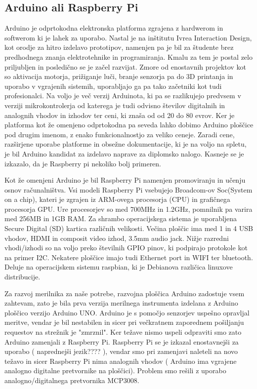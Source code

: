 \documentclass[12pt,a4paper,titlepage,openany]{report}
\begin{document}
\subsection{Arduino ali Raspberry Pi}
Arduino je odprtokodna elektronska platforma zgrajena z hardwerom in softwerom ki je lahek za uporabo. Nastal je na inštitutu Ivrea Interaction Design, kot orodje za hitro izdelavo prototipov, namenjen pa je bil za študente brez predhodnega znanja elektrotehnike in programiranja. Kmalu za tem je postal zelo priljubljen in posledično se je začel razvijat. Zmore od enostavnih projektov kot so aktivacija motorja, prižiganje luči, branje senzorja pa do 3D printanja in uporabo v vgrajenih sistemih, uporabljajo ga pa tako začetniki kot tudi profesionalci. Na voljo je več verzij Arduinota, ki pa se razlikujejo predvsem v verziji mikrokontrolerja od katerega je tudi odvisno številov digitalnih in analognih vhodov in izhodov ter ceni, ki znaša od od 20 do 80 evrov. Ker je platforma kot že omenjeno odprtokodna pa seveda lahko dobimo Arduino ploščice pod drugim imenom, z enako funkcionalnostjo za veliko ceneje. Zaradi cene, razširjene uporabe platforme in obsežne dokumentacije, ki je na voljo na spletu, je bil Arduino kandidat za izdelavo naprave za diplomsko nalogo. Kasneje se je izkazalo, da je Raspberry pi nekoliko bolj     primeren.

Kot že omenjeni Arduino je bil Raspberry Pi namenjen promoviranju in učenju osnov računalništva. Vsi modeli Raspberry Pi vsebujejo Broadcom-ov Soc(System on a chip), kateri je zgrajen iz ARM-ovega procesorja (CPU) in grafičnega procesorja GPU. Ure procesorjev so med 700MHz in 1.2GHz, pomnilnik pa varira med 256MB in 1GB RAM. Za shrambo operacijskega sistema je uporabljena Secure Digital (SD) kartica različnih velikosti. Večina ploščic ima med 1 in 4 USB vhodov, HDMI in composit video izhod, 3.5mm audio jack. Nižje razredni vhodi/izhodi so na voljo preko številnih GPIO pinov, ki podpirajo protokole kot na primer I2C. Nekatere ploščice imajo tudi Ethernet port in WIFI ter bluetooth. Deluje na operacijskem sistemu raspbian, ki je Debianova različica linuxove distribucije.

Za razvoj merilnika za naše potrebe, razvojna ploščica Arduino zadostuje vsem zahtevam, zato je bila prva verzija merilnega instrumenta izdelana z Arduino ploščico verzijo Arduino UNO. Arduino je s pomočjo senzorjev uspešno opravljal meritve, vendar je bil nestabilen in sicer pri večkratnem zaporednem pošiljanju requestov na strežnik  je "zmrznil". Ker težave nismo uspeli odpraviti smo zato Arduino zamenjali z Raspberry Pi. Raspberry Pi se je izkazal enostavnejši za uporabo ( naprednejši jezik???? ), vendar smo pri zamenjavi naleteli na novo težavo in sicer Raspberry Pi nima analognih vhodov ( Arduino ima vgrajene analogno digitalne pretvornike na ploščici). Problem smo rešili z uporabo analogno/digitalnega pretvornika MCP3008.
\end{document}
